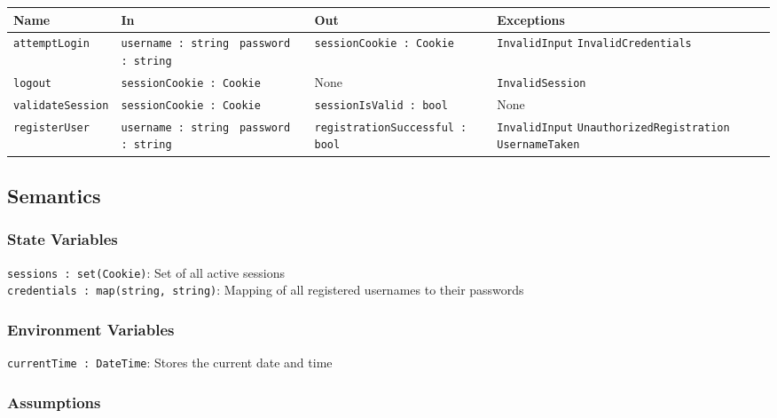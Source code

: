 \documentclass[12pt, titlepage]{article}
\begin{document}
\begin{center}
\begin{tabularx}{\textwidth}{p{} p{} p{} p{}}
\hline
\textbf{Name} & \textbf{In} & \textbf{Out} & \textbf{Exceptions} \\
\hline
\texttt{attemptLogin} & \texttt{username : string } \newline \texttt{password : string} & \texttt{sessionCookie : Cookie} & \texttt{InvalidInput} \newline \texttt{InvalidCredentials} \\
\hline
\texttt{logout} & \texttt{sessionCookie : Cookie }  & None & \texttt{InvalidSession} \\
\hline
\texttt{validateSession} & \texttt{sessionCookie : Cookie} & \texttt{sessionIsValid : bool} & None\\
\hline
\texttt{registerUser} & \texttt{username : string } \newline \texttt{password : string} & \texttt{registrationSuccessful : bool} & \texttt{InvalidInput} \newline \texttt{UnauthorizedRegistration} \newline \texttt{UsernameTaken} \\
\hline
\end{tabularx}
\end{center}

\subsection{Semantics}

\subsubsection{State Variables}

\texttt{sessions : set(Cookie)}: Set of all active sessions \\
\texttt{credentials : map(string, string)}: Mapping of all registered usernames to their passwords

\subsubsection{Environment Variables}

\texttt{currentTime : DateTime}: Stores the current date and time

\subsubsection{Assumptions}
\end{document}
